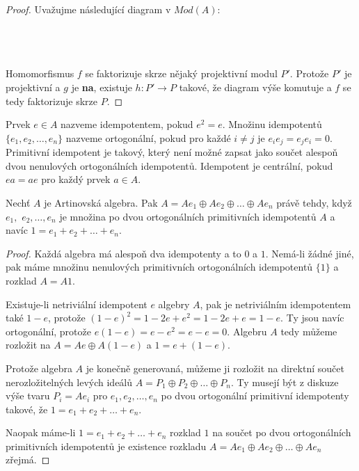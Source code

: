      \begin{proof}
       Uvažujme následující diagram v $Mod(A)$:\\\\
       \centerline{}\\\\
      Homomorfismus $f$ se faktorizuje skrze nějaký projektivní modul $P'$. 
      Protože $P'$ je projektivní a $g$ je \textbf{na}, existuje $h:P'\rightarrow P$ 
      takové, že diagram výše komutuje a $f$ se tedy faktorizuje skrze $P$.
     \end{proof}
        
     \begin{dfn}
       Prvek $e\in A$ nazveme idempotentem, pokud $e^2=e$. 
       Množinu idempotentů $\{e_1,e_2,\ldots,e_n\}$
       nazveme ortogonální, pokud pro každé $i\neq j$ je $e_ie_j=e_je_i=0$. Primitivní 
       idempotent je takový, který není možné zapsat jako součet alespoň 
       dvou nenulových ortogonálních idempotentů. 
       Idempotent je centrální, pokud $ea=ae$  pro každý prvek $a\in A$.
     \end{dfn}
     
     \begin{thm}\label{rozklad-A-na-proj}
       Nechť $A$ je Artinovská algebra. Pak $A=Ae_1\oplus Ae_2\oplus\ldots\oplus 
       Ae_n$ právě tehdy, když $e_1,$ $e_2,\ldots,e_n$ je množina po dvou ortogonálních 
       primitivních idempotentů $A$ a navíc $1=e_1+e_2+\ldots+e_n$.
     \end{thm}
     
     \begin{proof}
       Každá algebra má alespoň dva idempotenty a to $0$ a $1$. Nemá-li žádné 
       jiné, pak máme množinu nenulových primitivních ortogonálních idempotentů 
       $\{1\}$ a rozklad $A=A1$.
       
       Existuje-li netriviální idempotent $e$ algebry $A$, pak je netriviálním 
       idempotentem také $1-e$, protože 
       $(1-e)^2=1-2e+e^2=1-2e+e=1-e$. Ty jsou 
       navíc ortogonální, protože $e(1-e)=e-e^2=e-e=0$. 
       Algebru $A$ tedy můžeme 
       rozložit na $A=Ae\oplus A(1-e)$ a $1=e + (1-e)$.
       
       Protože algebra $A$ je konečně generovaná, můžeme ji rozložit na direktní součet 
       nerozložitelných levých ideálů $A=P_1\oplus P_2\oplus\ldots\oplus P_n$. 
       Ty musejí být z diskuze výše tvaru $P_i=Ae_i$ pro $e_1,e_2,\ldots,e_n$ po 
       dvou ortogonální primitivní idempotenty takové, že $1=e_1+e_2+\ldots+e_n$.
       
       Naopak máme-li $1=e_1+e_2+\ldots+e_n$ rozklad $1$ na součet po dvou 
       ortogonálních primitivních idempotentů je existence rozkladu $A=Ae_1\oplus Ae_2\oplus\ldots\oplus 
       Ae_n$ zřejmá.
     \end{proof}
       
